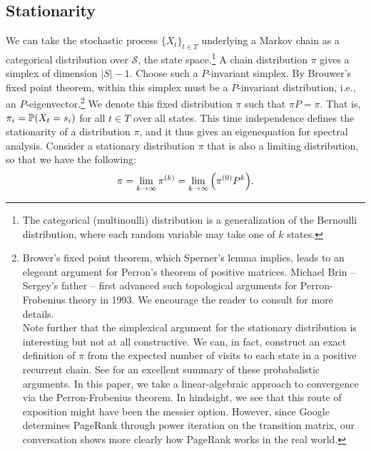 \documentclass[../exploring-pagerank.tex]{subfiles}
\begin{document}
    \subsection{Stationarity}
    We can take the stochastic process $\{X_t\}_{t \in T}$ underlying a Markov chain as a categorical distribution over $\mathcal{S}$, the state space.\footnote{The categorical (multinoulli) distribution is a generalization of the Bernoulli distribution, where each random variable may take one of $k$ states.} A chain distribution $\pi$ gives a simplex of dimension $|S| - 1$. Choose such a $P$-invariant simplex. By Brouwer's fixed point theorem, within this simplex must be a $P$-invariant distribution, i.e., an $P$-eigenvector.\footnote{Brower's fixed point theorem, which Sperner's lemma implies, leads to an elegeant argument for Perron's theorem of positive matrices. Michael Brin -- Sergey's father -- first advanced such topological arguments for Perron-Frobenius theory in 1993. We encourage the reader to consult \cite{boyleBasicPerronFrobeniusTheory} for more details. \vspace{0.5em} \\  Note further that the simplexical argument for the stationary distribution is interesting but not at all constructive. We can, in fact, construct an exact definition of $\pi$ from the expected number of visits to each state in a positive recurrent chain. See \cite{freedmanConvergenceTheoremFinite} for an excellent summary of these probabalistic arguments. In this paper, we take a linear-algebraic approach to convergence via the Perron-Frobenius theorem. In hindsight, we see that this route of exposition might have been the messier option. However, since Google determines PageRank through power iteration on the transition matrix, our conversation shows more clearly how PageRank works in the real world.} We denote this fixed distribution $\pi$ such that $\pi P = \pi$. That is, $\pi_i = \mathbb{P}(X_t = s_i)$ for all $t\in T$ over all states. This time independence defines the stationarity of a distribution $\pi$, and it thus gives an eigenequation for spectral analysis. Consider a stationary distribution $\pi$ that is also a limiting distribution, so that we have the following:
	\begin{equation*}
		\pi = \lim_{k\to\infty}{{\pi^{(k)}}} = \lim_{k\to\infty}{\left( {\pi^{(0)}} P^k \right)}.
	\end{equation*}
	
\end{document}
